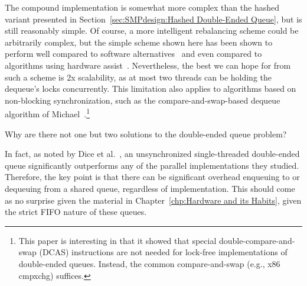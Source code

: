 The compound implementation is somewhat more complex than the
hashed variant presented in
Section~\ref{sec:SMPdesign:Hashed Double-Ended Queue},
but is still reasonably simple.
Of course, a more intelligent rebalancing scheme could be arbitrarily
complex, but the simple scheme shown here has been shown to
perform well compared to software
alternatives~\cite{LukeDalessandro:2011:ASPLOS:HybridNOrecSTM:deque}
and even compared to algorithms using hardware
assist~\cite{DavidDice:2010:SCA:HTM:deque}.
Nevertheless, the best we can hope for from such a scheme
is 2x scalability, as at most two threads can be holding the
dequeue's locks concurrently.
This limitation also applies to algorithms based on non-blocking
synchronization, such as the compare-and-swap-based dequeue algorithm of
Michael~\cite{DBLP:conf/europar/Michael03}.\footnote{
	This paper is interesting in that it showed that special
	double-compare-and-swap (DCAS) instructions are not needed
	for lock-free implementations of double-ended queues.
	Instead, the common compare-and-swap (e.g., x86 cmpxchg)
	suffices.}

\QuickQuiz{}
	Why are there not one but two solutions to the double-ended queue
	problem?
 \QuickQuizEnd

In fact, as noted by Dice et al.~\cite{DavidDice:2010:SCA:HTM:deque},
an unsynchronized single-threaded double-ended queue significantly
outperforms any of the parallel implementations they studied.
Therefore, the key point is that there can be significant overhead enqueuing to
or dequeuing from a shared queue, regardless of implementation.
This should come as no surprise given the material in
Chapter~\ref{chp:Hardware and its Habits}, given the strict
FIFO nature of these queues.

